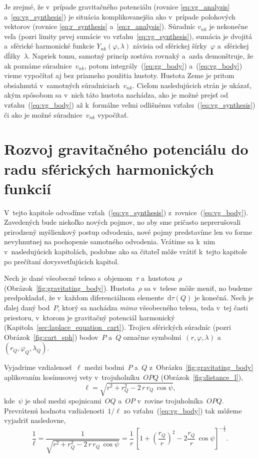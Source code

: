 \documentclass[a4paper, 12pt]{book}
\newcommand{\diff}{\mathrm d}
\begin{document}
Je zrejmé, že v~prípade gravitačného potenciálu (rovnice \ref{eq:vg_analysis}
a~\ref{eq:vg_synthesis}) je situácia komplikovanejšia ako v~prípade polohových
vektorov (rovnice \ref{eq:r_synthesis} a~\ref{eq:r_analysis}).  Súradníc
$v_{nk}$ je nekonečne veľa (pozri limity prvej sumácie vo
vzťahu~\ref{eq:vg_synthesis}), sumácia je dvojitá a~sférické harmonické funkcie
$Y_{nk}(\varphi, \lambda)$ závisia od sférickej šírky~$\varphi$ a~sférickej
dĺžky~$\lambda$.  Napriek tomu, samotný princíp zostáva rovnaký a~azda
demonštruje, že ak poznáme súradnice~$v_{nk}$, potom
integrály~(\ref{eq:gg_body}) a~(\ref{eq:vg_body}) vieme vypočítať aj bez
priameho použitia hustoty.  Hustota Zeme je pritom obsiahnutá v~samotných
súradniciach~$v_{nk}$.  Cieľom nasledujúcich strán je ukázať, akým spôsobom sa
v~nich táto hustota nachádza, ako je možné prejsť od vzťahu~(\ref{eq:vg_body})
až k~formálne veľmi odlišnému vzťahu~(\ref{eq:vg_synthesis}) či ako je možné
súradnice~$v_{nk}$ vypočítať.



\section{Rozvoj gravitačného potenciálu do radu sférických harmonických
funkcií}
\label{sec:vg_sh_expansion}

V~tejto kapitole odvodíme vzťah~(\ref{eq:vg_synthesis})
z~rovnice~(\ref{eq:vg_body}).  Zavedených bude niekoľko nových pojmov, no aby 
sme pričasto neprerušovali prirodzený myšlienkový postup odvodenia, nové pojmy
predstavíme len vo forme nevyhnutnej na pochopenie samotného odvodenia.
Vrátime sa k~nim v~nasledujúcich kapitolách, podobne ako sa čitateľ môže vrátiť
k~tejto kapitole po prečítaní dovysvetľujúcich kapitol.

Nech je dané všeobecné teleso s~objemom~$\tau$ a~hustotou~$\rho$
(Obrázok~\ref{fig:gravitating_body}).  Hustota~$\rho$ sa v~telese môže meniť,
no budeme predpokladať, že v~každom diferenciálnom elemente~$\diff \tau(Q)$ je
konečná.  Nech je ďalej daný bod~$P$, ktorý sa nachádza \emph{mimo} všeobecného
telesa, teda v~tej časti priestoru, v~ktorom je gravitačný potenciál harmonický
(Kapitola~\ref{sec:laplace_equation_cart}).  Trojicu sférických súradníc (pozri
Obrázok~\ref{fig:cart_sph}) bodov~$P$ a~$Q$ označme symbolmi~$(r, \varphi,
\lambda)$ a~$(r_Q, \varphi_Q, \lambda_Q)$.

Vyjadrime vzdialenosť~$\ell$ medzi bodmi~$P$ a~$Q$
z~Obrázku~\ref{fig:gravitating_body} aplikovaním kosínusovej vety
v~trojuholníku~$OPQ$ (Obrázok~\ref{fig:distance_l}),
%
\begin{equation}
\label{eq:l_sph}
\ell = \sqrt{r^2 + r_Q^2 - 2 \, r \, r_Q \, \cos\psi}{,}
\end{equation}
%
kde~$\psi$ je uhol medzi spojnicami~$OQ$ a~$OP$ v~rovine trojuholníka~$OPQ$.
Prevrátenú hodnotu vzdialenosti~$1 \slash \ell$ zo vzťahu~(\ref{eq:vg_body}) 
tak môžeme vyjadriť nasledovne,
%
\begin{equation}
\label{eq:1l}
\frac{1}{\ell} = \frac{1}{\sqrt{ r^2 + r_Q^2 - 2 \, r \, r_Q \, \cos\psi
}} = \frac{1}{r} \, \left[1 + \left( \dfrac{r_Q}{r}
\right)^2 - 2 \dfrac{r_Q}{r} \, \cos\psi \right]^{-\frac{1}{2}}{.}
\end{equation}
\end{document}
